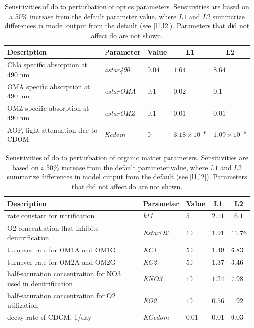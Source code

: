 \documentclass[letterpaper,12pt,oneside]{article}\usepackage[]{graphicx}\usepackage[]{color}
\begin{document}
\begin{table}[!tbp]
{\normalsize
\caption{Sensitivities of \ac{do} to perturbation of optics parameters.  Sensitivities are based on a 50\% increase from the default parameter value, where $L1$ and $L2$ summarize differences in model output from the default (see \cref{l1,l2}).  Parameters that did not affect \ac{do} are not shown.\label{tab:optsens}} 
\begin{center}
\begin{tabular}{lllll}
\hline\hline
\multicolumn{1}{l}{Description}&\multicolumn{1}{c}{Parameter}&\multicolumn{1}{c}{Value}&\multicolumn{1}{c}{L1}&\multicolumn{1}{c}{L2}\tabularnewline
\hline
Chla specific absorption at 490 nm&\textit{astar490}&$0.04$&$1.64$&$8.64$\tabularnewline
OMA specific absorption at 490 nm&\textit{astarOMA}&$0.1$&$0.02$&$0.1$\tabularnewline
OMZ specific absorption at 490 nm&\textit{astarOMZ}&$0.1$&$0.01$&$0.01$\tabularnewline
AOP, light attenuation due to CDOM&\textit{Kcdom}&$0$&$3.18\times 10^{-6}$&$1.09\times 10^{-5}$\tabularnewline
\hline
\end{tabular}\end{center}}

\end{table}


\begin{table}[!tbp]
{\normalsize
\caption{Sensitivities of \ac{do} to perturbation of organic matter parameters.  Sensitivities are based on a 50\% increase from the default parameter value, where $L1$ and $L2$ summarize differences in model output from the default (see \cref{l1,l2}).  Parameters that did not affect \ac{do} are not shown.\label{tab:omsens}} 
\begin{center}
\begin{tabular}{lllll}
\hline\hline
\multicolumn{1}{l}{Description}&\multicolumn{1}{c}{Parameter}&\multicolumn{1}{c}{Value}&\multicolumn{1}{c}{L1}&\multicolumn{1}{c}{L2}\tabularnewline
\hline
rate constant for nitrification&\textit{k11}&$5$&$2.11$&$16.1$\tabularnewline
O2 concentration that inhibits denitrification&\textit{KstarO2}&$10$&$1.91$&$11.76$\tabularnewline
turnover rate for OM1A and OM1G&\textit{KG1}&$50$&$1.49$&$6.83$\tabularnewline
turnover rate for OM2A and OM2G&\textit{KG2}&$50$&$1.37$&$3.46$\tabularnewline
half-saturation concentration for NO3 used in denitrification&\textit{KNO3}&$10$&$1.24$&$7.98$\tabularnewline
half-saturation concentration for O2 utilization&\textit{KO2}&$10$&$0.56$&$1.92$\tabularnewline
decay rate of CDOM, 1/day&\textit{KGcdom}&$0.01$&$0.01$&$0.03$\tabularnewline
\hline
\end{tabular}\end{center}}

\end{table}
\end{document}
